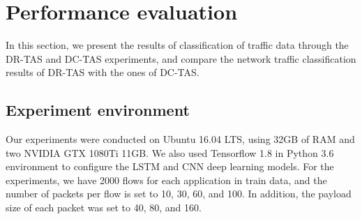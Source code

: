 \documentclass[10pt, twoside, jounal]{IEEEtran}
\begin{document}
\section{Performance evaluation}
In this section, we present the results of classification of traffic data through the DR-TAS and DC-TAS experiments, and compare the network traffic classification results of DR-TAS with the ones of DC-TAS.

\subsection{Experiment environment}
Our experiments were conducted on Ubuntu 16.04 LTS, using 32GB of RAM and two NVIDIA GTX 1080Ti 11GB.
We also used Tensorflow 1.8 in Python 3.6 environment to configure the LSTM and CNN deep learning models.
For the experiments, we have 2000 flows for each application in train data, and the number of packets per flow is set
to 10, 30, 60, and 100.
In addition, the payload size of each packet was set to 40, 80, and 160.
\end{document}

